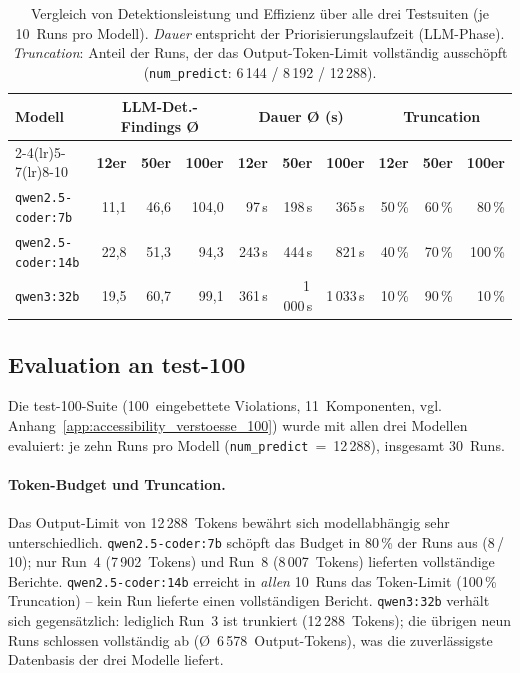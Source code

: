 \begin{table}[htbp]
\centering
\small
\renewcommand{\arraystretch}{1.15}
\begin{tabular}{@{}lrrrrrrrrr@{}}
\toprule
\textbf{Modell} &
\multicolumn{3}{c}{\textbf{LLM-Det.-Findings Ø}} &
\multicolumn{3}{c}{\textbf{Dauer Ø (s)}} &
\multicolumn{3}{c}{\textbf{Truncation}} \\
\cmidrule(lr){2-4}\cmidrule(lr){5-7}\cmidrule(lr){8-10}
 & \textbf{12er} & \textbf{50er} & \textbf{100er} & \textbf{12er} & \textbf{50er} & \textbf{100er} & \textbf{12er} & \textbf{50er} & \textbf{100er} \\
\midrule
\texttt{qwen2.5-coder:7b}  & 11{,}1 & 46{,}6 & 104{,}0 &  97\,s  &   198\,s  &   365\,s & 50\,\% & 60\,\% & 80\,\% \\
\texttt{qwen2.5-coder:14b} & 22{,}8 & 51{,}3 &  94{,}3 & 243\,s  &   444\,s  &   821\,s & 40\,\% & 70\,\% & 100\,\% \\
\texttt{qwen3:32b}         & 19{,}5 & 60{,}7 &  99{,}1 & 361\,s  & 1\,000\,s & 1\,033\,s & 10\,\% & 90\,\% & 10\,\% \\
\bottomrule
\end{tabular}
\caption[Skalierungsvergleich test-12 vs.\ test-50 vs.\ test-100]{Vergleich von Detektionsleistung und Effizienz über alle drei Testsuiten (je 10~Runs pro Modell). \textit{Dauer} entspricht der Priorisierungslaufzeit (LLM-Phase). \textit{Truncation}: Anteil der Runs, der das Output-Token-Limit vollständig ausschöpft (\texttt{num\_predict}: 6\,144 / 8\,192 / 12\,288).}
\label{tab:skalierungsvergleich}
\end{table}

\subsection{Evaluation an test-100}
\label{sec:eval_suiten_100}

Die test-100-Suite (100~eingebettete Violations, 11~Komponenten, vgl. Anhang~\ref{app:accessibility_verstoesse_100}) wurde mit allen drei Modellen evaluiert: je zehn Runs pro Modell (\texttt{num\_predict}~=~12\,288), insgesamt 30~Runs.

\paragraph{Token-Budget und Truncation.}
Das Output-Limit von 12\,288~Tokens bewährt sich modellabhängig sehr unterschiedlich. \texttt{qwen2.5-coder:7b} schöpft das Budget in 80\,\% der Runs aus (8\,/\,10); nur Run~4 (7\,902~Tokens) und Run~8 (8\,007~Tokens) lieferten vollständige Berichte. \texttt{qwen2.5-coder:14b} erreicht in \textit{allen} 10~Runs das Token-Limit (100\,\% Truncation) -- kein Run lieferte einen vollständigen Bericht. \texttt{qwen3:32b} verhält sich gegensätzlich: lediglich Run~3 ist trunkiert (12\,288~Tokens); die übrigen neun Runs schlossen vollständig ab (Ø~6\,578~Output-Tokens), was die zuverlässigste Datenbasis der drei Modelle liefert.

